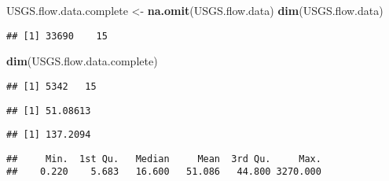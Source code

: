 \documentclass[]{article}
\newenvironment{Shaded}{\begin{snugshade}}{\end{snugshade}}
\newcommand{\KeywordTok}[1]{\textcolor[rgb]{0.13,0.29,0.53}{\textbf{#1}}}
\newcommand{\NormalTok}[1]{#1}
\newcommand{\OperatorTok}[1]{\textcolor[rgb]{0.81,0.36,0.00}{\textbf{#1}}}
\newcommand{\StringTok}[1]{\textcolor[rgb]{0.31,0.60,0.02}{#1}}
\begin{document}
\begin{Shaded}
\begin{Highlighting}[]
\NormalTok{USGS.flow.data.complete <-}\StringTok{ }\KeywordTok{na.omit}\NormalTok{(USGS.flow.data)}
\KeywordTok{dim}\NormalTok{(USGS.flow.data)}
\end{Highlighting}
\end{Shaded}

\begin{verbatim}
## [1] 33690    15
\end{verbatim}

\begin{Shaded}
\begin{Highlighting}[]
\KeywordTok{dim}\NormalTok{(USGS.flow.data.complete)}
\end{Highlighting}
\end{Shaded}

\begin{verbatim}
## [1] 5342   15
\end{verbatim}

\begin{Shaded}
\end{Shaded}

\begin{verbatim}
## [1] 51.08613
\end{verbatim}

\begin{Shaded}
\end{Shaded}

\begin{verbatim}
## [1] 137.2094
\end{verbatim}

\begin{Shaded}
\end{Shaded}

\begin{verbatim}
##     Min.  1st Qu.   Median     Mean  3rd Qu.     Max. 
##    0.220    5.683   16.600   51.086   44.800 3270.000
\end{verbatim}
\end{document}
